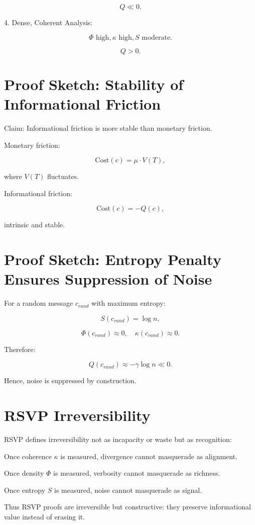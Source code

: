 \documentclass{book}
\begin{document}
\[ Q \ll 0. \]

4. Dense, Coherent Analysis:

\[ \Phi \text{ high}, \kappa \text{ high}, S \text{ moderate}. \]

\[ Q > 0. \]

\section{Proof Sketch: Stability of Informational Friction}

Claim: Informational friction is more stable than monetary friction.

Monetary friction:

\[ \text{Cost}(c) = \mu \cdot V(T), \]

where \( V(T) \) fluctuates.

Informational friction:

\[ \text{Cost}(c) = -Q(c), \]

intrinsic and stable.

\section{Proof Sketch: Entropy Penalty Ensures Suppression of Noise}

For a random message \( c_{rand} \) with maximum entropy:

\[ S(c_{rand}) = \log n, \]

\[ \Phi(c_{rand}) \approx 0, \quad \kappa(c_{rand}) \approx 0. \]

Therefore:

\[ Q(c_{rand}) \approx -\gamma \log n \ll 0. \]

Hence, noise is suppressed by construction.

\section{RSVP Irreversibility}

RSVP defines irreversibility not as incapacity or waste but as recognition:

Once coherence \( \kappa \) is measured, divergence cannot masquerade as alignment.

Once density \( \Phi \) is measured, verbosity cannot masquerade as richness.

Once entropy \( S \) is measured, noise cannot masquerade as signal.

Thus RSVP proofs are irreversible but constructive: they preserve informational value instead of erasing it.
\end{document}
